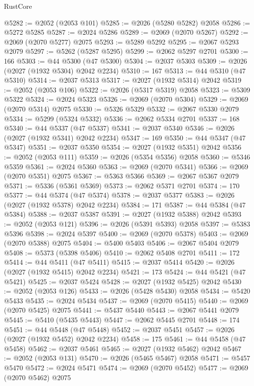 \begin{lexlean}{RustCore}
\begin{coremodule}
@5282 := @2052 (@2053 @101)
@5285 := @2026 (@5280 @5282) @2058
@5286 := @5272 @5285
@5287 := @2024 @5286
@5289 := @2069 (@2070 @5267)
@5292 := @2069 (@2070 @5277) @2075
@5293 := @5289 @5292
@5295 := @2067 @5293 @2079
@5297 := @5262 (@5287 @5295)
@5299 := @2062 @5297 @2701
@5300 := 166
@5303 := @44 @5300 (@47 @5300)
@5304 := @2037 @5303
@5309 := @2026 (@2027 (@1932 @5304) @2042 @2234)
@5310 := 167
@5313 := @44 @5310 (@47 @5310)
@5314 := @2037 @5313
@5317 := @2027 (@1932 @5314) @2042
@5319 := @2052 (@2053 @106)
@5322 := @2026 (@5317 @5319) @2058
@5323 := @5309 @5322
@5324 := @2024 @5323
@5326 := @2069 (@2070 @5304)
@5329 := @2069 (@2070 @5314) @2075
@5330 := @5326 @5329
@5332 := @2067 @5330 @2079
@5334 := @5299 (@5324 @5332)
@5336 := @2062 @5334 @2701
@5337 := 168
@5340 := @44 @5337 (@47 @5337)
@5341 := @2037 @5340
@5346 := @2026 (@2027 (@1932 @5341) @2042 @2234)
@5347 := 169
@5350 := @44 @5347 (@47 @5347)
@5351 := @2037 @5350
@5354 := @2027 (@1932 @5351) @2042
@5356 := @2052 (@2053 @111)
@5359 := @2026 (@5354 @5356) @2058
@5360 := @5346 @5359
@5361 := @2024 @5360
@5363 := @2069 (@2070 @5341)
@5366 := @2069 (@2070 @5351) @2075
@5367 := @5363 @5366
@5369 := @2067 @5367 @2079
@5371 := @5336 (@5361 @5369)
@5373 := @2062 @5371 @2701
@5374 := 170
@5377 := @44 @5374 (@47 @5374)
@5378 := @2037 @5377
@5383 := @2026 (@2027 (@1932 @5378) @2042 @2234)
@5384 := 171
@5387 := @44 @5384 (@47 @5384)
@5388 := @2037 @5387
@5391 := @2027 (@1932 @5388) @2042
@5393 := @2052 (@2053 @121)
@5396 := @2026 (@5391 @5393) @2058
@5397 := @5383 @5396
@5398 := @2024 @5397
@5400 := @2069 (@2070 @5378)
@5403 := @2069 (@2070 @5388) @2075
@5404 := @5400 @5403
@5406 := @2067 @5404 @2079
@5408 := @5373 (@5398 @5406)
@5410 := @2062 @5408 @2701
@5411 := 172
@5414 := @44 @5411 (@47 @5411)
@5415 := @2037 @5414
@5420 := @2026 (@2027 (@1932 @5415) @2042 @2234)
@5421 := 173
@5424 := @44 @5421 (@47 @5421)
@5425 := @2037 @5424
@5428 := @2027 (@1932 @5425) @2042
@5430 := @2052 (@2053 @126)
@5433 := @2026 (@5428 @5430) @2058
@5434 := @5420 @5433
@5435 := @2024 @5434
@5437 := @2069 (@2070 @5415)
@5440 := @2069 (@2070 @5425) @2075
@5441 := @5437 @5440
@5443 := @2067 @5441 @2079
@5445 := @5410 (@5435 @5443)
@5447 := @2062 @5445 @2701
@5448 := 174
@5451 := @44 @5448 (@47 @5448)
@5452 := @2037 @5451
@5457 := @2026 (@2027 (@1932 @5452) @2042 @2234)
@5458 := 175
@5461 := @44 @5458 (@47 @5458)
@5462 := @2037 @5461
@5465 := @2027 (@1932 @5462) @2042
@5467 := @2052 (@2053 @131)
@5470 := @2026 (@5465 @5467) @2058
@5471 := @5457 @5470
@5472 := @2024 @5471
@5474 := @2069 (@2070 @5452)
@5477 := @2069 (@2070 @5462) @2075

\end{coremodule}
\end{lexlean}
